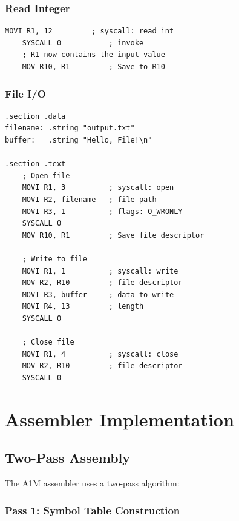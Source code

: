 \documentclass[12pt,a4paper,oneside]{book}
\begin{document}
\subsection{Read Integer}

\begin{lstlisting}[style=assembly, caption={Read Integer Example}]
    MOVI R1, 12         ; syscall: read_int
    SYSCALL 0           ; invoke
    ; R1 now contains the input value
    MOV R10, R1         ; Save to R10
\end{lstlisting}

\subsection{File I/O}

\begin{lstlisting}[style=assembly, caption={File I/O Example}]
.section .data
filename: .string "output.txt"
buffer:   .string "Hello, File!\n"

.section .text
    ; Open file
    MOVI R1, 3          ; syscall: open
    MOVI R2, filename   ; file path
    MOVI R3, 1          ; flags: O_WRONLY
    SYSCALL 0
    MOV R10, R1         ; Save file descriptor
    
    ; Write to file
    MOVI R1, 1          ; syscall: write
    MOV R2, R10         ; file descriptor
    MOVI R3, buffer     ; data to write
    MOVI R4, 13         ; length
    SYSCALL 0
    
    ; Close file
    MOVI R1, 4          ; syscall: close
    MOV R2, R10         ; file descriptor
    SYSCALL 0
\end{lstlisting}

\chapter{Assembler Implementation}

\section{Two-Pass Assembly}

The A1M assembler uses a two-pass algorithm:

\subsection{Pass 1: Symbol Table Construction}
\end{document}
